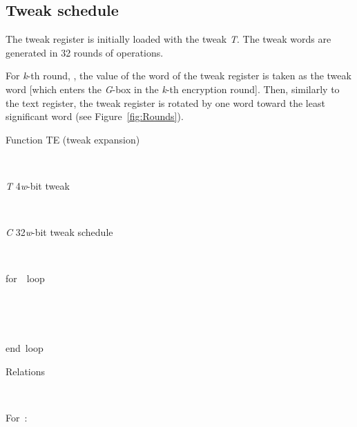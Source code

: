 \documentclass[a4paper,oneside,english]{amsart}
\numberwithin{equation}{section}
\numberwithin{figure}{section}
\newenvironment{lyxlist}[1]
{\begin{list}{}
{\settowidth{\labelwidth}{#1}
 \setlength{\leftmargin}{\labelwidth}
 \addtolength{\leftmargin}{\labelsep}
 \renewcommand{\makelabel}[1]{##1\hfil}}}
{\end{list}}
\newenvironment{lyxcode}
{\par\begin{list}{}{
\setlength{\rightmargin}{\leftmargin}
\setlength{\listparindent}{0pt}\raggedright
\setlength{\itemsep}{0pt}
\setlength{\parsep}{0pt}
\normalfont\ttfamily}\item[]}
{\end{list}}
\begin{document}
\subsection{Tweak schedule}

The tweak register  is initially loaded
with the tweak \emph{T}. The tweak words are generated in 32 rounds
of operations.

For \emph{k}-th round, , the value of the word 
of the tweak register is taken as the tweak word  {[}which
enters the \emph{G}-box in the \emph{k}-th encryption round{]}. Then,
similarly to the text register, the tweak register is rotated by one
word toward the least significant word (see Figure~\ref{fig:Rounds}).

\begin{algorithm}


\caption{\label{alg:Function-TE}Function TE (tweak expansion) }

\begin{description}
\item [{Input}]~

\begin{lyxlist}{00.00.0000}
\item [{\emph{T}}] 4\emph{w}-bit tweak
\end{lyxlist}
\item [{Output}]~

\begin{lyxlist}{00.00.0000}
\item [{\emph{C}}] 32\emph{w}-bit tweak schedule
\end{lyxlist}
\item [{Pseudo-code}]~\end{description}
\begin{lyxcode}


for~~loop

~~

~~

end~loop~\end{lyxcode}
\begin{description}
\item [{Relations}]~\end{description}
\begin{lyxcode}


For~:~

~~

~~

~~

~~

~~

~\end{lyxcode}
\end{algorithm}
\end{document}
